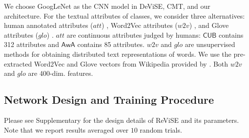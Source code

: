 {We choose GoogLeNet \cite{szegedy2015going} as the CNN model in DeViSE, CMT, and our architecture. For the textual attributes of classes, we consider three alternatives: human annotated attributes ($\mathit{att}$) \cite{lampert2014attribute}, Word2Vec attributes ($\mathit{w2v}$) \cite{mikolov2013distributed}, and Glove attributes ($\mathit{glo}$) \cite{pennington2014glove}. $\mathit{att}$ are continuous attributes judged by humans: $\mathsf{CUB}$ contains 312 attributes and $\mathsf{AwA}$ contains 85 attributes. $\mathit{w2v}$ and $\mathit{glo}$ are unsupervised methods for obtaining distributed text representations of words. We use the pre-extracted Word2Vec and Glove vectors from Wikipedia provided by \cite{akata2015evaluation,xian2016latent}. Both $\mathit{w2v}$ and $\mathit{glo}$ are 400-dim. features.

\subsection{Network Design and Training Procedure}
\label{subsec:train_pro}
{
	Please see Supplementary for the design details of ReViSE and its parameters. Note that we report results averaged over $10$ random trials.

}

}
